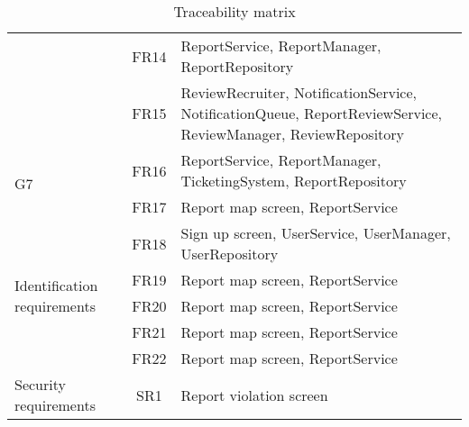 \begin{table}[H]
\begin{tabular}{|p{2cm}|c|p{8cm}|}
        & FR14 & ReportService, ReportManager, ReportRepository \\ \cline{2-3}
        & FR15 & ReviewRecruiter, NotificationService, NotificationQueue, ReportReviewService, ReviewManager, ReviewRepository \\ \hline
        \multirow{2}{2cm}{G7} & FR16 & ReportService, ReportManager, TicketingSystem, ReportRepository \\ \cline{2-3}
        & FR17 & Report map screen, ReportService \\ \hline
        \multirow{5}{2cm}{Identification requirements} & FR18 & Sign up screen, UserService, UserManager, UserRepository \\ \cline{2-3}
        & FR19 & Report map screen, ReportService \\ \cline{2-3}
        & FR20 & Report map screen, ReportService \\ \cline{2-3}
        & FR21 & Report map screen, ReportService \\ \cline{2-3}
        & FR22 & Report map screen, ReportService \\ \hline
        Security requirements & SR1 & Report violation screen \\ \hline
    \end{tabular}
    \caption{\label{tbl:traceability-matrix} Traceability matrix}
\end{table}
